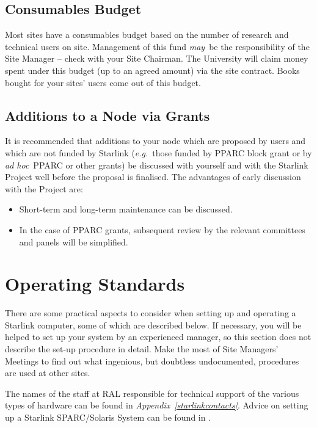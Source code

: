 \subsection{Consumables Budget}

Most sites have a consumables budget based on the number of research
and technical users on site.
Management of this fund {\em may}\, be the responsibility of the Site Manager --
check with your Site Chairman.
The University will claim money spent under this budget (up to an agreed
amount) via the site contract.
Books bought for your sites' users come out of this budget.

\subsection {Additions to a Node via Grants}

It is recommended that additions to your node which are proposed by users and
which are not funded by Starlink ({\em e.g.}\, those funded by PPARC block
grant or by {\em ad hoc}\, PPARC or other grants) be discussed with yourself
and with the Starlink Project well before the proposal is finalised.
The advantages of early discussion with the Project are:

\begin{itemize}
\item Short-term and long-term maintenance can be discussed.
\item In the case of PPARC grants, subsequent review by the relevant 
 committees and panels will be simplified.
\end{itemize}

\newpage

\section{\label{operatingstandards}Operating Standards}

There are some practical aspects to consider when setting up and operating a
Starlink computer, some of which are described below.
If necessary, you will be helped to set up your system by an experienced
manager, so this section does not describe the set-up procedure in detail.
Make the most of Site Managers' Meetings to find out what ingenious, but
doubtless undocumented, procedures are used at other sites.

The names of the staff at RAL responsible for technical support
of the various types of hardware can be found in
{\em Appendix~\ref{starlinkcontacts}}.
Advice on setting up a Starlink SPARC/Solaris System can be found in
. 

